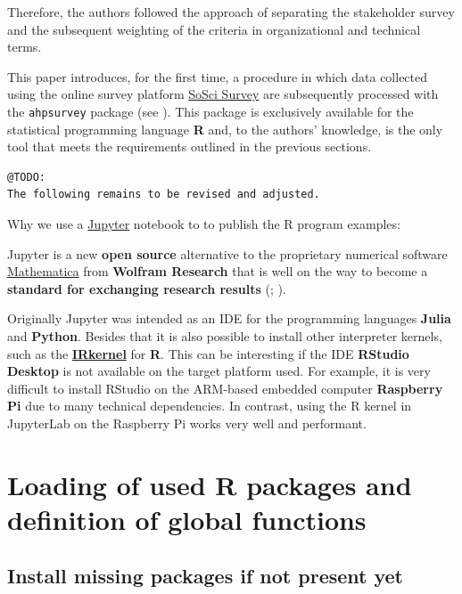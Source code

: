\documentclass [oneside,10pt,a4paper,ngerman,BCOR10mm,headsepline,parindent,final]{scrartcl}
\begin{document}
Therefore, the authors followed the approach of separating the
stakeholder survey and the subsequent weighting of the criteria in
organizational and technical terms.

This paper introduces, for the first time, a procedure in which data
collected using the online survey platform
\href{https://www.soscisurvey.de}{SoSci Survey} are subsequently
processed with the \texttt{ahpsurvey} package (see
\cite{Vignettes_ahpsurvey_2019}). This package is exclusively available
for the statistical programming language \textbf{R} and, to the authors'
knowledge, is the only tool that meets the requirements outlined in the
previous sections.

\begin{verbatim}
@TODO:
The following remains to be revised and adjusted.
\end{verbatim}

Why we use a
\href{https://en.wikipedia.org/wiki/Project_Jupyter}{Jupyter} notebook
to to publish the R program examples:

Jupyter is a new \textbf{open source} alternative to the proprietary
numerical software
\href{https://en.wikipedia.org/wiki/Wolfram_Mathematica}{Mathematica}
from \textbf{Wolfram Research} that is well on the way to become a
\textbf{standard for exchanging research results}
(\cite{Scientific_Paper_obsolete_2018};
\cite{Future_of_Research_Paper_2018}).

Originally Jupyter was intended as an IDE for the programming languages
\textbf{Julia} and \textbf{Python}. Besides that it is also possible to
install other interpreter kernels, such as the
\textbf{\href{https://irkernel.github.io/installation/}{IRkernel}} for
\textbf{R}. This can be interesting if the IDE \textbf{RStudio Desktop}
is not available on the target platform used. For example, it is very
difficult to install RStudio on the ARM-based embedded computer
\textbf{Raspberry Pi} due to many technical dependencies. In contrast,
using the R kernel in JupyterLab on the Raspberry Pi works very well and
performant.

    \hypertarget{loading-of-used-r-packages-and-definition-of-global-functions}{%
\section{Loading of used R packages and definition of global
functions}\label{loading-of-used-r-packages-and-definition-of-global-functions}}

\hypertarget{install-missing-packages-if-not-present-yet}{%
\subsection{Install missing packages if not present
yet}\label{install-missing-packages-if-not-present-yet}}
\end{document}
